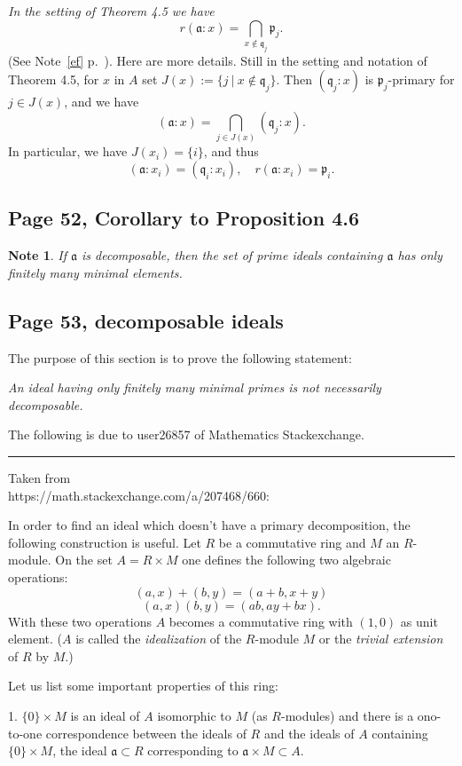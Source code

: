 \documentclass[parskip=half,fontsize=12pt]{scrartcl}%
\newcommand{\mf}{\mathfrak}
\newcommand{\aaa}{\mf a}
\newcommand{\ppp}{\mf p}
\newcommand{\qqq}{\mf q}
\newtheorem{note}[thm]{Note}
\begin{document}
{\em In the setting of Theorem 4.5 we have} 
\begin{equation}\label{45}
r(\aaa:x)=\bigcap_{x\notin\qqq_j}\ppp_j.
\end{equation}
(See Note~\ref{ef} p.~\pageref{ef}). Here are more details. Still in the setting and notation of Theorem 4.5, for $x$ in $A$ set $J(x):=\{j\ |\ x\notin\qqq_j\}$. Then $(\qqq_j:x)$ is $\ppp_j$-primary for $j\in J(x)$, and we have 
$$
(\aaa:x)=\bigcap_{j\in J(x)}(\qqq_j:x).
$$ 
In particular, we have $J(x_i)=\{i\}$, and thus 
$$
(\aaa:x_i)=(\qqq_i:x_i),\quad r(\aaa:x_i)=\ppp_i.
$$

\subsection{Page 52, Corollary to Proposition 4.6}%

\begin{note}\label{fmme}
If $\aaa$ is decomposable, then the set of prime ideals containing $\aaa$ has only finitely many minimal elements.
\end{note}

\subsection{Page 53, decomposable ideals}\label{di}%

The purpose of this section is to prove the following statement:

\emph{An ideal having only finitely many minimal primes is not necessarily decomposable.}

The following is due to user26857 of Mathematics Stackexchange.\bigskip\bigskip

\hrule\bigskip

Taken from\\ https://math.stackexchange.com/a/207468/660:

In order to find an ideal which doesn't have a primary decomposition, the following construction is useful. Let $R$ be a commutative ring and $M$ an $R$-module. On the set $A=R\times M$ one defines the following two algebraic operations:
$$
(a,x)+(b,y)=(a+b,x+y)
$$
$$
(a,x)(b,y)=(ab,ay+bx).
$$
With these two operations $A$ becomes a commutative ring with $(1,0)$ as unit element. ($A$
is called the \emph{idealization} of the $R$-module $M$ or the \emph{trivial extension} of $R$ by $M$.)

Let us list some important properties of this ring:

1. $\{0\}\times M$ is an ideal of $A$ isomorphic to $M$ (as $R$-modules) and there is a ono-to-one correspondence between the ideals of $R$ and the ideals of $A$ containing $\{0\}\times M$, the ideal $\aaa\subset R$ corresponding to $\aaa\times M\subset A$.
\end{document}
